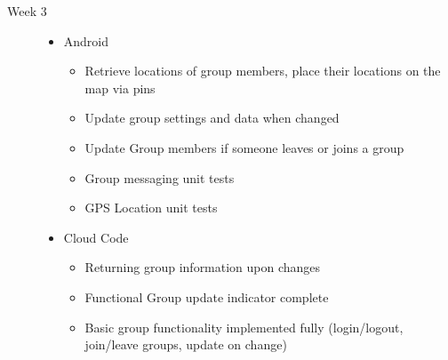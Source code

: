 \begin{description}
  \item[Week 3] \hfill
		\begin{itemize}
		\item Android
		\begin{itemize}
			\item Retrieve locations of group members, place their locations on the map via pins
			\item Update group settings and data when changed
			\item Update Group members if someone leaves or joins a group
			\item Group messaging unit tests
			\item GPS Location unit tests
		\end{itemize}
		\item Cloud Code
		\begin{itemize}
			\item Returning group information upon changes
			\item Functional Group update indicator complete
			\item Basic group functionality implemented fully (login/logout, join/leave groups, update on change)
		\end{itemize}
	\end{itemize}
\end{description}

